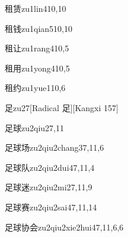 \begin{entry}{租赁}{zu1lin4}{10,10}
\end{entry}

\begin{entry}{租钱}{zu1qian5}{10,10}
\end{entry}

\begin{entry}{租让}{zu1rang4}{10,5}
\end{entry}

\begin{entry}{租用}{zu1yong4}{10,5}
\end{entry}

\begin{entry}{租约}{zu1yue1}{10,6}
\end{entry}

\begin{entry}{足}{zu2}{7}[Radical 足][Kangxi 157]
\end{entry}

\begin{entry}{足球}{zu2qiu2}{7,11}
\end{entry}

\begin{entry}{足球场}{zu2qiu2chang3}{7,11,6}
\end{entry}

\begin{entry}{足球队}{zu2qiu2dui4}{7,11,4}
\end{entry}

\begin{entry}{足球迷}{zu2qiu2mi2}{7,11,9}
\end{entry}

\begin{entry}{足球赛}{zu2qiu2sai4}{7,11,14}
\end{entry}

\begin{entry}{足球协会}{zu2qiu2xie2hui4}{7,11,6,6}
\end{entry}

